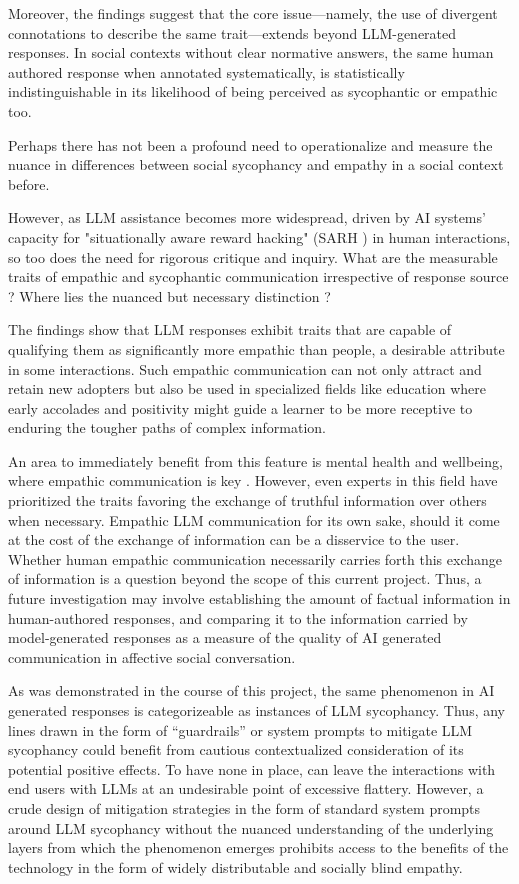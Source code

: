 Moreover, the findings suggest that the core issue—namely, the use of divergent connotations to describe the same trait—extends beyond LLM-generated responses. In social contexts without clear normative answers, the same human authored response when annotated systematically, is statistically indistinguishable in its likelihood of being perceived as sycophantic or empathic too.


Perhaps there has not been a profound need to operationalize and measure the nuance in differences between social sycophancy and empathy in a social context before.

However, as LLM assistance becomes more widespread, driven by AI systems’ capacity for "situationally aware reward hacking" (SARH \cite{alignmentprob}) in human interactions, so too does the need for rigorous critique and inquiry. What are the measurable traits of empathic and sycophantic communication irrespective of response source ? Where lies the nuanced but necessary distinction ?


\bigskip The findings show that LLM responses exhibit traits that are capable of qualifying them as significantly more empathic than people, a desirable attribute in some interactions. Such empathic communication can not only attract and retain new adopters but also be used in specialized fields like education where early accolades and positivity might guide a learner to be more receptive to enduring the tougher paths of complex information. 


An area to immediately benefit from this feature is mental health and wellbeing, where empathic communication is key \cite{conditions-rogers}. However, even experts in this field have prioritized the traits favoring the exchange of truthful information over others \cite[33]{rogers1961becoming} when necessary. Empathic LLM communication for its own sake, should it come at the cost of the exchange of information can be a disservice to the user. Whether human empathic communication necessarily carries forth this exchange of information is a question beyond the scope of this current project. Thus, a future investigation may involve establishing the amount of factual information in human-authored responses, and comparing it to the information carried by model-generated responses as a measure of the quality of AI generated communication in affective social conversation. 


\bigskip As was demonstrated in the course of this project, the same phenomenon in AI generated responses is categorizeable as instances of LLM sycophancy. Thus, any lines drawn in the form of “guardrails” or system prompts to mitigate LLM sycophancy could benefit from cautious contextualized consideration of its potential positive effects. To have none in place, can leave the interactions with end users with LLMs at an undesirable point of excessive flattery. However, a crude design of mitigation strategies in the form of standard system prompts around LLM sycophancy without the nuanced understanding of the underlying layers from which the phenomenon emerges prohibits access to the benefits of the technology in the form of widely distributable and socially blind empathy.



